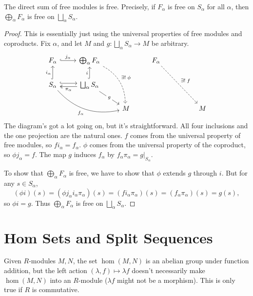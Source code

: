 \documentclass[twoside,10pt]{report}
\begin{document}
\begin{thrm}[]
The direct sum of free modules is free. Precisely, if $F_{\alpha}$ is free on $S_{\alpha}$ for all $\alpha$, then $\bigoplus_\alpha F_{\alpha}$ is free on $\bigsqcup_{\alpha}S_{\alpha}$.
\end{thrm}
\begin{proof}
	This is essentially just using the universal properties of free modules and coproducts. Fix $\alpha$, and let $M$ and $g:\bigsqcup_\alpha S_{\alpha}\to M$ be arbitrary.
	\[
		\begin{tikzcd}
F_\alpha \arrow[r, "j_\alpha", hook]                                                                  & \bigoplus_\alpha F_\alpha \arrow[rdd, "\exists!\;\phi", dashed, bend left]                                                        &   & F_\alpha \arrow[rrdd, "\exists!\;f", dashed] &  &   \\
S_\alpha \arrow[rrd, "f_\alpha"', bend right] \arrow[u, "i_\alpha", hook] \arrow[r, hook, shift left] & \bigsqcup_\alpha S_\alpha \arrow[u, "i", hook] \arrow[rd, "g" description] \arrow[l, "\pi_\alpha", two heads, shift left] &   &                                              &  &   \\
                                                                                                      &                                                                                                                                   & M &                                              &  & M
\end{tikzcd}
	\] The diagram's got a lot going on, but it's straightforward. All four inclusions and the one projection are the natural ones. $f$ comes from the universal property of free modules, so $fi_{\alpha}=f_{\alpha}$. $\phi$ comes from the universal property of the coproduct, so $\phi j_{\alpha}=f$. The map $g$ induces $f_{\alpha}$ by $f_{\alpha}\pi_{\alpha}=g|_{S_{\alpha}}$.

	To show that $\bigoplus_{\alpha}F_{\alpha}$ is free, we have to show that $\phi$ extends $g$ through $i$. But for any $s \in S_{\alpha}$,
	\[
		(\phi i)(s) = (\phi j_{\alpha}i_{\alpha} \pi_{\alpha})(s) = (f i_{\alpha}\pi_{\alpha})(s) = (f_{\alpha}\pi_{\alpha})(s) = g(s),
	\] so $\phi i=g$. Thus $\bigoplus_{\alpha}F_{\alpha}$ is free on $\bigsqcup_\alpha S_{\alpha}$.
\end{proof}


\section{Hom Sets and Split Sequences}

Given $R$-modules $M,N$, the set $\hom(M,N)$ is an abelian group under function addition, but the left action $(\lambda, f) \mapsto \lambda f$ doesn't necessarily make $\hom(M,N)$ into an $R$-module ($\lambda f$ might not be a morphism). This is only true if $R$ is commutative.
\end{document}
